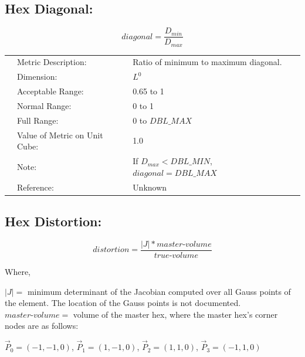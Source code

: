 \documentclass[12pt]{article}
\begin{document}
\subsection*{Hex Diagonal:}

\begin{displaymath}
diagonal = \frac {D_{min}} { D_{max}} 
\end{displaymath}

\begin{tabular}{lll}
& Metric Description:  & Ratio of minimum to maximum diagonal. \\ 
& Dimension:           & $L^0$                              \\ 
& Acceptable Range:    & 0.65 to 1  \\
& Normal Range:        & 0 to 1 \\ 
& Full Range:          & 0 to $DBL\_MAX$ \\ 
& Value of Metric on Unit Cube:    & 1.0 \\
& Note:                & If $D_{max} < DBL\_MIN$, $diagonal = DBL\_MAX $ \\ 
& Reference:           & Unknown \\ 
\end{tabular} 


\subsection*{Hex Distortion:} 

\begin{displaymath}
distortion = \frac{ |J|*master\textrm{-}volume} { true\textrm{-}volume }  
\end{displaymath}

\begin{flushleft} Where, \end{flushleft}
$|J| = $ minimum determinant of the Jacobian computed over all Gauss points  \newline
of the element.  The location of the Gauss points is not documented. \newline 
$master\textrm{-}volume =$ volume of the master hex, where the master hex's corner \newline
nodes are as follows: \newline

 $\vec P_0 = (-1, -1, 0)$,  
 $\vec P_1 = (1, -1, 0)$,
 $\vec P_2 = (1, 1, 0)$, 
 $\vec P_3 = (-1, 1, 0)$  \newline
\end{document}

